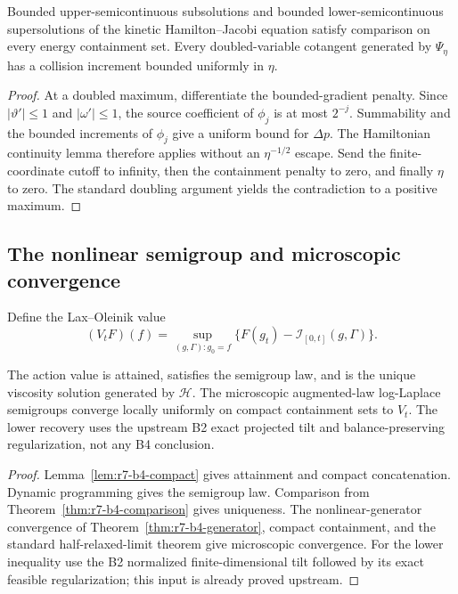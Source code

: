 \begin{theorem}
\label{thm:r7-b4-comparison}
Bounded upper-semicontinuous subsolutions and bounded lower-semicontinuous
supersolutions of the kinetic Hamilton--Jacobi equation satisfy comparison on
every energy containment set.  Every doubled-variable cotangent generated by
$\Psi_\eta$ has a collision increment bounded uniformly in $\eta$.
\end{theorem}

\begin{proof}
At a doubled maximum, differentiate the bounded-gradient penalty.  Since
$|\vartheta'|\le1$ and $|\omega'|\le1$, the source coefficient of $\phi_j$ is
at most $2^{-j}$.  Summability and the bounded increments of $\phi_j$ give a
uniform bound for $\Delta p$.  The Hamiltonian continuity lemma therefore
applies without an $\eta^{-1/2}$ escape.  Send the finite-coordinate cutoff to
infinity, then the containment penalty to zero, and finally $\eta$ to zero.
The standard doubling argument yields the contradiction to a positive maximum.
\end{proof}

\subsection{The nonlinear semigroup and microscopic convergence}

Define the Lax--Oleinik value
\[
 (V_tF)(f)=\sup_{(g,\Gamma):g_0=f}
 \{F(g_t)-\mathcal I_{[0,t]}(g,\Gamma)\}.
\]

\begin{theorem}
\label{thm:r7-b4-semigroup}
The action value is attained, satisfies the semigroup law, and is the unique
viscosity solution generated by $\mathcal H$.  The microscopic augmented-law
log-Laplace semigroups converge locally uniformly on compact containment sets
to $V_t$.  The lower recovery uses the upstream B2 exact projected tilt and
balance-preserving regularization, not any B4 conclusion.
\end{theorem}

\begin{proof}
Lemma~\ref{lem:r7-b4-compact} gives attainment and compact concatenation.
Dynamic programming gives the semigroup law.  Comparison from
Theorem~\ref{thm:r7-b4-comparison} gives uniqueness.  The nonlinear-generator
convergence of Theorem~\ref{thm:r7-b4-generator}, compact containment, and the
standard half-relaxed-limit theorem give microscopic convergence.  For the
lower inequality use the B2 normalized finite-dimensional tilt followed by
its exact feasible regularization; this input is already proved upstream.
\end{proof}

